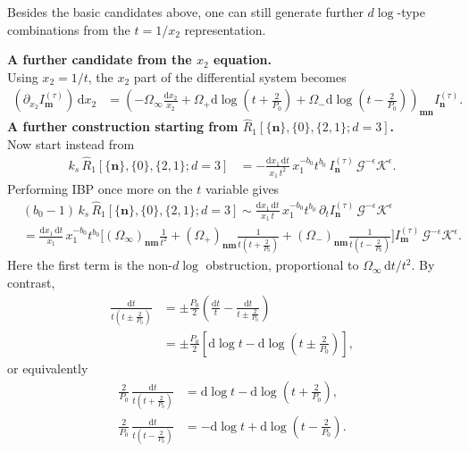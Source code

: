 \documentclass[a4paper,12pt]{article}
\newcommand{\n}{\nonumber}
\def\di{{\mathrm{d}}}
\def\ep{\epsilon}
\newcommand{\mG}{\mathcal{G}}
\newcommand{\mK}{\mathcal{K}}
\begin{document}
Besides the basic candidates above, one can still generate further $d\log$-type combinations from the $t=1/x_2$ representation.

\textbf{A further candidate from the $x_2$ equation.} \\
Using $x_2=1/t$, the $x_2$ part of the differential system becomes
\begin{align}
	(\partial_{x_2} I^{(\tau)}_{\bm m})\,\di x_2
	&= \left(
	-\Omega_\infty \frac{\di x_2}{x_2}
	+ \Omega_+ \di\log\left(t+\frac{2}{P_0}\right)
	+ \Omega_- \di\log\left(t-\frac{2}{P_0}\right)
	\right)_{\bm m\bm n} I^{(\tau)}_{\bm n}.
\end{align}
\textbf{A further construction starting from $\hat{R}_1[\{\bm n\},\{0\},\{2,1\};d=3]$.} \\
Now start instead from
\begin{align}
	k_s\,\hat{R}_1[\{\bm n\},\{0\},\{2,1\};d=3]
	&= -\frac{\di x_1\,\di t}{x_1\,t^2}\,
	x_1^{-b_0}t^{b_0}\,I^{(\tau)}_{\bm n}\,\mG^{-\ep}\mK^{\ep}.
\end{align}
Performing IBP once more on the $t$ variable gives
\begin{align}
	&(b_0-1)\,k_s\,\hat{R}_1[\{\bm n\},\{0\},\{2,1\};d=3]
	\sim \frac{\di x_1\,\di t}{x_1\,t}\,
	x_1^{-b_0}t^{b_0}\,\partial_t I^{(\tau)}_{\bm n}\,\mG^{-\ep}\mK^{\ep} \n\\
	&= \frac{\di x_1\,\di t}{x_1}\,x_1^{-b_0}t^{b_0}
	\Bigg[
	(\Omega_\infty)_{\bm n\bm m}\frac{1}{t^2}
	+(\Omega_+)_{\bm n\bm m}\frac{1}{t\left(t+\frac{2}{P_0}\right)}
	+(\Omega_-)_{\bm n\bm m}\frac{1}{t\left(t-\frac{2}{P_0}\right)}
	\Bigg]
	I^{(\tau)}_{\bm m}\,\mG^{-\ep}\mK^{\ep}.
\end{align}
Here the first term is the non-$d\log$ obstruction, proportional to $\Omega_\infty\,\di t/t^2$. By contrast,
\begin{align}
	\frac{\di t}{t\left(t\pm \frac{2}{P_0}\right)}
	&= \pm \frac{P_0}{2}
	\left(
	\frac{\di t}{t}
	-\frac{\di t}{t\pm \frac{2}{P_0}}
	\right) \n\\
	&= \pm \frac{P_0}{2}
	\left[
	\di\log t-\di\log\left(t\pm \frac{2}{P_0}\right)
	\right],
\end{align}
or equivalently
\begin{align}
	\frac{2}{P_0}\,\frac{\di t}{t\left(t+\frac{2}{P_0}\right)}
	&= \di\log t-\di\log\left(t+\frac{2}{P_0}\right), \n\\
	\frac{2}{P_0}\,\frac{\di t}{t\left(t-\frac{2}{P_0}\right)}
	&= -\di\log t+\di\log\left(t-\frac{2}{P_0}\right).
\end{align}
\end{document}
